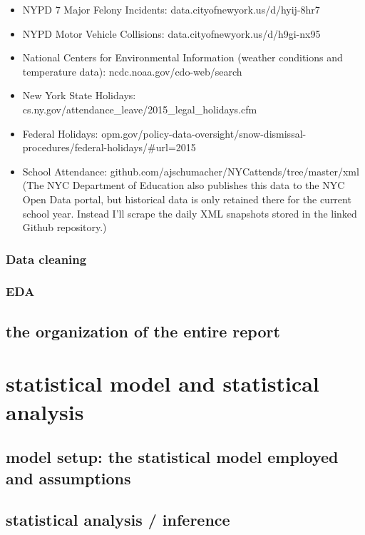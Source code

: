 \documentclass[12pt,notitlepage]{article}
\begin{document}
\begin{itemize}
\item NYPD 7 Major Felony Incidents: data.cityofnewyork.us/d/hyij-8hr7
\item NYPD Motor Vehicle Collisions: data.cityofnewyork.us/d/h9gi-nx95
\item National Centers for Environmental Information (weather conditions and temperature data): ncdc.noaa.gov/cdo-web/search
\item New York State Holidays: cs.ny.gov/attendance\_leave/2015\_legal\_holidays.cfm
\item Federal Holidays: opm.gov/policy-data-oversight/snow-dismissal-procedures/federal-holidays/\#url=2015
\item School Attendance: github.com/ajschumacher/NYCattends/tree/master/xml
(The NYC Department of Education also publishes this data to the NYC Open Data portal, but historical data is only retained there for the current school year. Instead I’ll scrape the daily XML snapshots stored in the linked Github repository.)
\end{itemize}

\subsubsection{Data cleaning}


\subsubsection{EDA}


\subsection{the organization of the entire report}






\section{statistical model and statistical analysis}


\subsection{model setup: the statistical model employed and assumptions}


\subsection{statistical analysis / inference}
\end{document}
